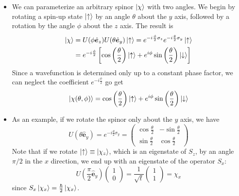 \documentclass[11pt, a4paper]{article}
\renewcommand{\vec}[1]{\bm{#1}}  %
\newcommand{\uvec}[1]{\hat{\vec{#1}}}  %
\newcommand{\ua}{\uparrow}  %
\newcommand{\da}{\downarrow}  %
\begin{document}
\begin{itemize}
	\item We can parameterize an arbitrary spinor $ \ket{\chi} $ with two angles. We begin by rotating a spin-up state $ \ket{\ua} $ by an angle $ \theta $ about the $ y $ axis, followed by a rotation by the angle $ \phi $ about the $ z $ axis. The result is
	\begin{align*}
		\ket{\chi} &= U(\phi \uvec{e}_{z})U(\theta \uvec{e}_{y})\ket{\ua} = e^{-i\frac{\phi}{2}\sigma_{z}} e^{-i\frac{\theta}{2}\sigma_{y}}\ket{\ua}\\
		& = e^{-i\frac{\phi}{2}}\left[\cos \left(\frac{\theta}{2}\right)\ket{\ua} + e^{i \phi} \sin \left(\frac{\theta}{2}\right)\ket{\da}\right]
	\end{align*}
	Since a wavefunction is determined only up to a constant phase factor, we can neglect the coefficient $ e^{-i\frac{\phi}{2}} $ go get
	\begin{equation*}
		\ket{\chi(\theta, \phi)} = \cos \left(\frac{\theta}{2}\right)\ket{\ua} + e^{i \phi} \sin \left(\frac{\theta}{2}\right)\ket{\da}
	\end{equation*}
	
	\item As an example, if we rotate the spinor only about the $ y $ axis, we have
	\begin{equation*}
		U(\theta \uvec{e}_{y}) = e^{-i\frac{\theta}{2}\sigma_{y}} = 
		\begin{pmatrix}
			\cos \frac{\theta}{2} & - \sin \frac{\theta}{2} \\
			\sin \frac{\theta}{2} & \cos \frac{\theta}{2} 
		\end{pmatrix}
	\end{equation*}
	Note that if we rotate $ \ket{\ua} \equiv \ket{\chi_{z}} $, which is an eigenstate of $ S_{z} $, by an angle $ \pi/2 $ in the $ x $ direction, we end up with an eigenstate of the operator $ S_{x} $:
	\begin{equation*}
		U\left(\frac{\pi}{2}\uvec{e}_{y} \right) 
		\begin{pmatrix}
			1\\
			0
		\end{pmatrix}
		= \frac{1}{\sqrt{t}} 
		\begin{pmatrix}
			1\\
			1
		\end{pmatrix}
		= \chi_{x}
	\end{equation*}
	since $ S_{x}\ket{\chi_{x}} = \frac{\hbar}{2}\ket{\chi_{x}} $. 
	

\end{itemize}
\end{document}
